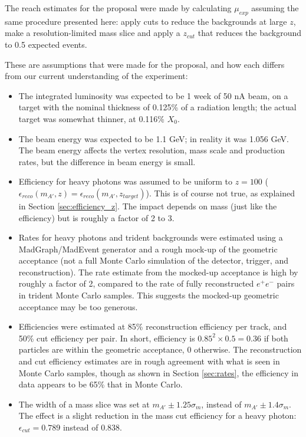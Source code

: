 The reach estimates for the proposal were made by calculating $\mu_{exp}$ assuming the same procedure presented here: apply cuts to reduce the backgrounds at large $z$, make a resolution-limited mass slice and apply a $z_{cut}$ that reduces the background to 0.5 expected events.


These are assumptions that were made for the proposal, and how each differs from our current understanding of the experiment:
\begin{itemize}
\item The integrated luminosity was expected to be 1 week of 50 nA beam, on a target with the nominal thickness of 0.125\% of a radiation length; the actual target was somewhat thinner, at 0.116\% $X_0$.
\item The beam energy was expected to be 1.1 GeV; in reality it was 1.056 GeV. The beam energy affects the vertex resolution, mass scale and production rates, but the difference in beam energy is small.
\item Efficiency for heavy photons was assumed to be uniform to $z=100$ ($\epsilon_{reco}(m_{A'},z) = \epsilon_{reco}(m_{A'},z_{target})$).
This is of course not true, as explained in Section \ref{sec:efficiency_z}.
The impact depends on mass (just like the efficiency) but is roughly a factor of 2 to 3.
\item Rates for heavy photons and trident backgrounds were estimated using a MadGraph/MadEvent generator and a rough mock-up of the geometric acceptance (not a full Monte Carlo simulation of the detector, trigger, and reconstruction).
The rate estimate from the mocked-up acceptance is high by roughly a factor of 2, compared to the rate of fully reconstructed $e^+e^-$ pairs in trident Monte Carlo samples.
This suggests the mocked-up geometric acceptance may be too generous.
\item Efficiencies were estimated at 85\% reconstruction efficiency per track, and 50\% cut efficiency per pair.
In short, efficiency is $0.85^2\times 0.5=0.36$ if both particles are within the geometric acceptance, 0 otherwise.
The reconstruction and cut efficiency estimates are in rough agreement with what is seen in Monte Carlo samples, though as shown in Section \ref{sec:rates}, the efficiency in data appears to be 65\% that in Monte Carlo.
\item The width of a mass slice was set at $m_{A'}\pm 1.25\sigma_m$, instead of $m_{A'}\pm 1.4\sigma_m$. The effect is a slight reduction in the mass cut efficiency for a heavy photon: $\epsilon_{cut}=0.789$ instead of 0.838.
\end{itemize}

